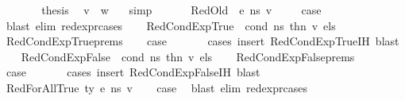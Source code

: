\begin{isabellebody}
\ \ \ \ \isamarkupfalse%
\ \isamarkupfalse%
\ {\isacharquery}{\kern0pt}thesis\ \isamarkupfalse%
\ {\isacartoucheopen}v\ {\isacharequal}{\kern0pt}\ w{\isacartoucheclose}\ \ \isamarkupfalse%
\ simp\isanewline
\ \ \isamarkupfalse%
\isanewline
{}\isamarkupfalse%
\isanewline
\ \ \isamarkupfalse%
\ {\isacharparenleft}{\kern0pt}RedOld\ {\isasymOmega}\ e\ n{\isacharunderscore}{\kern0pt}s\ v{\isacharparenright}{\kern0pt}\ \isanewline
\ \ \isamarkupfalse%
\ {\isacharquery}{\kern0pt}case\ \isamarkupfalse%
\ {\isacharparenleft}{\kern0pt}blast\ elim{\isacharcolon}{\kern0pt}\ red{\isacharunderscore}{\kern0pt}expr{\isachardot}{\kern0pt}cases{\isacharparenright}{\kern0pt}\isanewline
{}\isamarkupfalse%
\isanewline
\ \ \isamarkupfalse%
\ {\isacharparenleft}{\kern0pt}RedCondExpTrue\ {\isasymOmega}\ cond\ n{\isacharunderscore}{\kern0pt}s\ thn\ v\ els{\isacharparenright}{\kern0pt}\isanewline
\ \ \isamarkupfalse%
\ RedCondExpTrue{\isachardot}{\kern0pt}prems\isanewline
\ \ \isamarkupfalse%
\ {\isacharquery}{\kern0pt}case\ \isanewline
\ \ \ \ \isamarkupfalse%
\ {\isacharparenleft}{\kern0pt}cases{\isacharcomma}{\kern0pt}\ insert\ RedCondExpTrue{\isachardot}{\kern0pt}IH{\isacharcomma}{\kern0pt}\ blast{\isacharplus}{\kern0pt}{\isacharparenright}{\kern0pt}\isanewline
{}\isamarkupfalse%
\isanewline
\ \ \isamarkupfalse%
\ {\isacharparenleft}{\kern0pt}RedCondExpFalse\ {\isasymOmega}\ cond\ n{\isacharunderscore}{\kern0pt}s\ thn\ v\ els{\isacharparenright}{\kern0pt}\isanewline
\ \ \isamarkupfalse%
\ RedCondExpFalse{\isachardot}{\kern0pt}prems\isanewline
\ \ \isamarkupfalse%
\ {\isacharquery}{\kern0pt}case\ \isanewline
\ \ \ \ \isamarkupfalse%
\ {\isacharparenleft}{\kern0pt}cases{\isacharcomma}{\kern0pt}\ insert\ RedCondExpFalse{\isachardot}{\kern0pt}IH{\isacharcomma}{\kern0pt}\ blast{\isacharplus}{\kern0pt}{\isacharparenright}{\kern0pt}\isanewline
{}\isamarkupfalse%
\isanewline
\ \ \isamarkupfalse%
\ {\isacharparenleft}{\kern0pt}RedForAllTrue\ ty\ e\ n{\isacharunderscore}{\kern0pt}s\ v{\isacharprime}{\kern0pt}{\isacharparenright}{\kern0pt}\isanewline
\ \ \isamarkupfalse%
\ {\isacharquery}{\kern0pt}case\ \isamarkupfalse%
\ {\isacharparenleft}{\kern0pt}blast\ elim{\isacharcolon}{\kern0pt}\ red{\isacharunderscore}{\kern0pt}expr{\isachardot}{\kern0pt}cases{\isacharparenright}{\kern0pt}\isanewline

\end{isabellebody}
